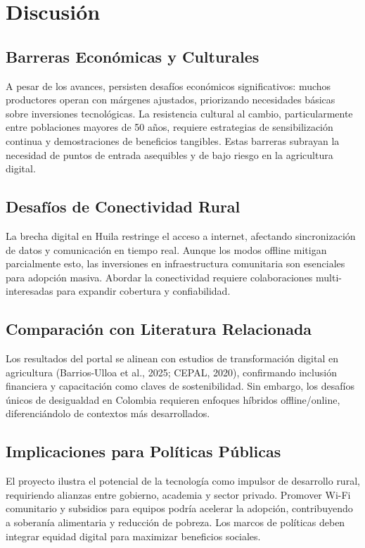 \section{Discusión}

\subsection{Barreras Económicas y Culturales}

A pesar de los avances, persisten desafíos económicos significativos: muchos productores operan con márgenes ajustados, priorizando necesidades básicas sobre inversiones tecnológicas. La resistencia cultural al cambio, particularmente entre poblaciones mayores de 50 años, requiere estrategias de sensibilización continua y demostraciones de beneficios tangibles. Estas barreras subrayan la necesidad de puntos de entrada asequibles y de bajo riesgo en la agricultura digital.
\subsection{Desafíos de Conectividad Rural}

La brecha digital en Huila restringe el acceso a internet, afectando sincronización de datos y comunicación en tiempo real. Aunque los modos offline mitigan parcialmente esto, las inversiones en infraestructura comunitaria son esenciales para adopción masiva. Abordar la conectividad requiere colaboraciones multi-interesadas para expandir cobertura y confiabilidad.
\subsection{Comparación con Literatura Relacionada}

Los resultados del portal se alinean con estudios de transformación digital en agricultura (Barrios-Ulloa et al., 2025; CEPAL, 2020), confirmando inclusión financiera y capacitación como claves de sostenibilidad. Sin embargo, los desafíos únicos de desigualdad en Colombia requieren enfoques híbridos offline/online, diferenciándolo de contextos más desarrollados.
\subsection{Implicaciones para Políticas Públicas}

El proyecto ilustra el potencial de la tecnología como impulsor de desarrollo rural, requiriendo alianzas entre gobierno, academia y sector privado. Promover Wi-Fi comunitario y subsidios para equipos podría acelerar la adopción, contribuyendo a soberanía alimentaria y reducción de pobreza. Los marcos de políticas deben integrar equidad digital para maximizar beneficios sociales.
